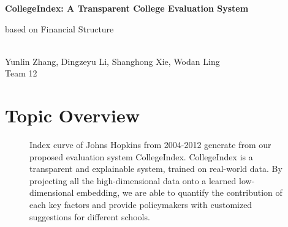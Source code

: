 \documentclass[11pt,letter]{article}
\newcommand*{\todo}[1]{%
  {\bf \color{red} #1}%
}
\begin{document}
                                         	


\setlength\parindent{0pt}
\setlength{\parskip}{0.7em}

{\LARGE \bf %
CollegeIndex: A Transparent College Evaluation System 

based on Financial Structure}%
\vspace{2mm}
\\
Yunlin Zhang, Dingzeyu Li, Shanghong Xie, Wodan Ling\\
Team 12
\vspace{-4mm}


\section{Topic Overview} 

\begin{figure}[H]
\centering
\vspace{-3mm}
\caption{Index curve of Johns Hopkins from 2004-2012 generate from our proposed evaluation system CollegeIndex. CollegeIndex is a transparent and explainable system, trained on real-world data.
By projecting all the high-dimensional data onto a learned low-dimensional embedding,
we are able to quantify the contribution of each key factors and provide 
 policymakers with customized suggestions for different schools. 
}
\vspace{-3mm}
\label{fig:collegeindex}
\end{figure}

\end{document}
